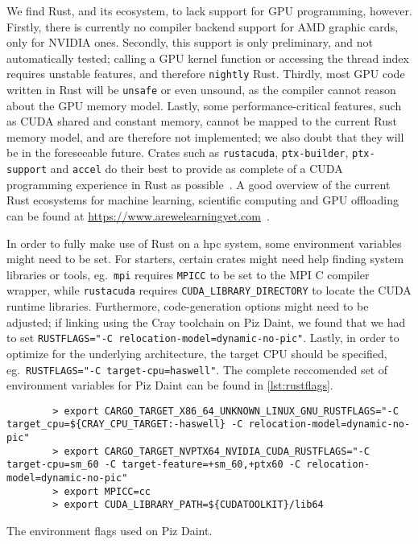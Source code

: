\documentclass[british]{scrreprt}
\begin{document}
We find Rust, and its ecosystem, to lack support for GPU programming, however. Firstly, there is currently no compiler backend support for AMD graphic cards, only for NVIDIA ones. Secondly, this support is only preliminary, and not automatically tested; calling a GPU kernel function or accessing the thread index requires unstable features, and therefore \texttt{nightly} Rust. Thirdly, most GPU code written in Rust will be \texttt{unsafe} or even unsound, as the compiler cannot reason about the GPU memory model. Lastly, some performance-critical features, such as CUDA shared and constant memory, cannot be mapped to the current Rust memory model, and are therefore not implemented; we also doubt that they will be in the foreseeable future. Crates such as \texttt{rustacuda}, \texttt{ptx-builder}, \texttt{ptx-support} and \texttt{accel} do their best to provide as complete of a CUDA programming experience in Rust as possible~\cite{rustacuda,ptx-builder,ptx-support,accel}. A good overview of the current Rust ecosystems for machine learning, scientific computing and GPU offloading can be found at \url{https://www.arewelearningyet.com}~\cite{NowellArewelearning}.

In order to fully make use of Rust on a \gls{hpc} system, some environment variables might need to be set. For starters, certain crates might need help finding system libraries or tools, eg.\ \texttt{mpi} requires \texttt{MPICC} to be set to the MPI C compiler wrapper, while \texttt{rustacuda} requires \texttt{CUDA_LIBRARY_DIRECTORY} to locate the CUDA runtime libraries. Furthermore, code-generation options might need to be adjusted; if linking using the Cray toolchain on Piz Daint, we found that we had to set \texttt{RUSTFLAGS="-C relocation-model=dynamic-no-pic"}. Lastly, in order to optimize for the underlying architecture, the target CPU should be specified, eg.\ \texttt{RUSTFLAGS="-C target-cpu=haswell"}. The complete reccomended set of environment variables for Piz Daint can be found in \cref{lst:rustflags}.

\begin{listing}
	\centering
	\begin{verbatim}
		> export CARGO_TARGET_X86_64_UNKNOWN_LINUX_GNU_RUSTFLAGS="-C target_cpu=${CRAY_CPU_TARGET:-haswell} -C relocation-model=dynamic-no-pic"
		> export CARGO_TARGET_NVPTX64_NVIDIA_CUDA_RUSTFLAGS="-C target-cpu=sm_60 -C target-feature=+sm_60,+ptx60 -C relocation-model=dynamic-no-pic"
		> export MPICC=cc
		> export CUDA_LIBRARY_PATH=${CUDATOOLKIT}/lib64
	\end{verbatim}
	\caption{The environment flags used on Piz Daint.}
	\label{lst:rustflags}
\end{listing}
\end{document}
